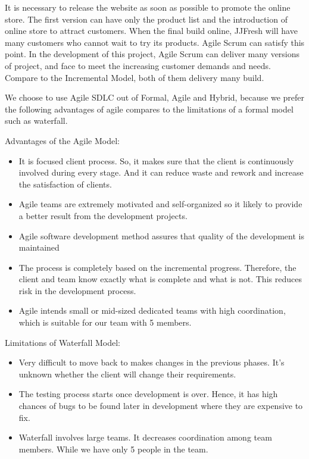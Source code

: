 \documentclass{report}
\begin{document}
It is necessary to release the website as soon as possible to promote the online store. The first version can have only the product list and the introduction of online store to attract customers. When the final build online, JJFresh will have many customers who cannot wait to try its products. Agile Scrum can satisfy this point. In the development of this project, Agile Scrum can deliver many versions of project, and face to meet the increasing customer demands and needs. Compare to the Incremental Model, both of them delivery many build.

We choose to use Agile SDLC out of Formal, Agile and Hybrid, because we prefer the following advantages of agile compares to the limitations of a formal model such as waterfall.

Advantages of the Agile Model:
\begin{itemize}
  \item It is focused client process. So, it makes sure that the client is continuously involved during every stage. And it can reduce waste and rework and increase the satisfaction of clients.
  \item Agile teams are extremely motivated and self-organized so it likely to provide a better result from the development projects.
  \item Agile software development method assures that quality of the development is maintained
  \item The process is completely based on the incremental progress. Therefore, the client and team know exactly what is complete and what is not. This reduces risk in the development process.
  \item Agile intends small or mid-sized dedicated teams with high coordination, which is suitable for our team with 5 members.
\end{itemize}
Limitations of Waterfall Model:
\begin{itemize}
  \item Very difficult to move back to makes changes in the previous phases. It's unknown whether the client will change their requirements.
  \item The testing process starts once development is over. Hence, it has high chances of bugs to be found later in development where they are expensive to fix.
  \item Waterfall involves large teams. It decreases coordination among team members. While we have only 5 people in the team.
\end{itemize}
\end{document}
